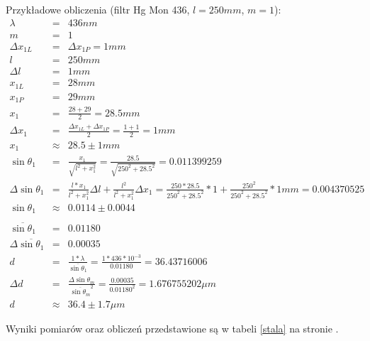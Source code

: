 \documentclass[wide,a4paper,titlepage,12pt]{mwart}
\begin{document}
Przykładowe obliczenia (filtr Hg Mon 436, $l=250mm$, $m=1$):
\begin{eqnarray*}
	\lambda &=& 436nm\\
	m &=& 1 \\
	\Delta x_{1L} &=& \Delta x_{1P} = 1mm \\
	l &=& 250mm \\
	\Delta l &=& 1mm \\
	x_{1L} &=& 28mm \\
	x_{1P} &=& 29mm \\
	x_1 &=& \frac{28+29}{2} = 28.5 mm \\
	\Delta x_1 &=& \frac{\Delta x_{1L} + \Delta x_{1P}}{2} = \frac{1 + 1}{2} = 1 mm \\
	x_1 &\approx& 28.5 \pm 1 mm \\
	\sin{\theta_1} &=& \frac{x_1}{\sqrt{l^2 + x_1^2}} = \frac{28.5}{\sqrt{250^2 + 28.5^2}} = 0.011399259 \\
	\Delta \sin{\theta_1} &=& \frac{l*x_1}{l^2 + x_1^2}\Delta l + \frac{l^2}{l^2 + x_1^2} \Delta x_1 = \frac{250 * 28.5}{250^2 + 28.5^2}*1 + \frac{250^2}{250^2 + 28.5^2}*1mm = 0.004370525 \\
	\sin{\theta_1} &\approx& 0.0114 \pm 0.0044 \\
	\\
	\overline{\sin{\theta_1}} &=& 0.01180 \\
	\Delta \overline{\sin{\theta_1}} &=& 0.00035 \\
	d &=& \frac{1*\lambda}{\overline{\sin{\theta}_1}} = \frac{1*436*10^{-3}}{0.01180} = 36.43716006 \\
	\Delta d &=& \frac{\Delta \sin{\theta_m}}{\overline{\sin{\theta}_m}^2} = \frac{0.00035}{0.01180^2} = 1.676755202 \mu m \\
	d &\approx& 36.4 \pm 1.7 \mu m
\end{eqnarray*}

Wyniki pomiarów oraz obliczeń przedstawione są w tabeli \ref{stala} na stronie \pageref{stala}.

    \clearpage
\end{document}
